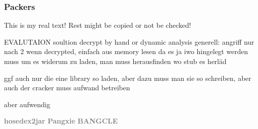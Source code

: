 \subsubsection{Packers}\label{subsubsection:evaluation-reengineering-propack-packers}
This is my real text! Rest might be copied or not be checked!

%
EVALUTAION\newline
soultion decrypt by hand or dynamic analysis\newline
generell: angriff nur nach 2 wenn decrypted, einfach aus memory lesen da es ja iwo hingelegt werden muss um es widerum zu laden, man muss herausfinden wo stub es herläd\newline

ggf auch nur die eine library so laden, aber dazu muss man sie so schreiben, aber auch der cracker muss aufwand betreiben\newline

aber aufwendig 
%

\newline\newline\textbf{\textcolor{gray}{hosedex2jar}}\newline
\newline\newline\textbf{\textcolor{gray}{Pangxie}}\newline
\newline\newline\textbf{\textcolor{gray}{BANGCLE}}\newline
